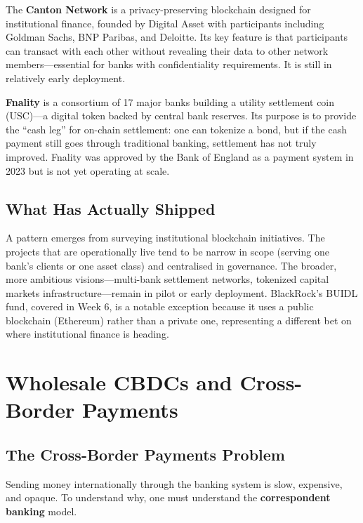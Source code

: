 \documentclass[11pt,a4paper]{article}
\newcommand{\keyword}[1]{\textbf{\textcolor{AccentOrange}{#1}}}
\begin{document}
The \keyword{Canton Network} is a privacy-preserving blockchain designed for institutional finance, founded by Digital Asset with participants including Goldman Sachs, BNP Paribas, and Deloitte. Its key feature is that participants can transact with each other without revealing their data to other network members---essential for banks with confidentiality requirements. It is still in relatively early deployment.

\keyword{Fnality} is a consortium of 17 major banks building a utility settlement coin (USC)---a digital token backed by central bank reserves. Its purpose is to provide the ``cash leg'' for on-chain settlement: one can tokenize a bond, but if the cash payment still goes through traditional banking, settlement has not truly improved. Fnality was approved by the Bank of England as a payment system in 2023 but is not yet operating at scale.

\subsection{What Has Actually Shipped}

A pattern emerges from surveying institutional blockchain initiatives. The projects that are operationally live tend to be narrow in scope (serving one bank's clients or one asset class) and centralised in governance. The broader, more ambitious visions---multi-bank settlement networks, tokenized capital markets infrastructure---remain in pilot or early deployment. BlackRock's BUIDL fund, covered in Week 6, is a notable exception because it uses a public blockchain (Ethereum) rather than a private one, representing a different bet on where institutional finance is heading.

\section{Wholesale CBDCs and Cross-Border Payments}

\subsection{The Cross-Border Payments Problem}

Sending money internationally through the banking system is slow, expensive, and opaque. To understand why, one must understand the \keyword{correspondent banking} model.
\end{document}
